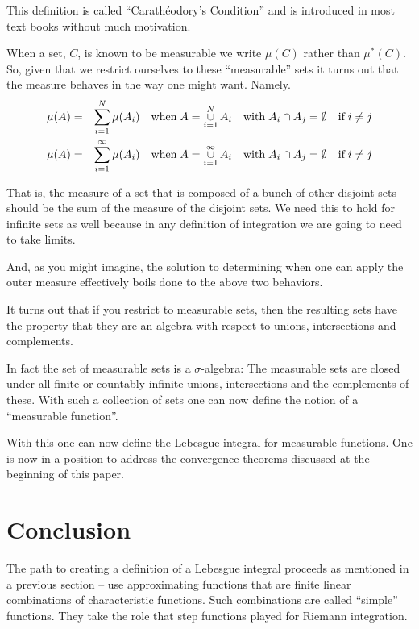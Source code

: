 \documentclass{article}
\begin{document}
This definition is called ``Carath\'eodory's Condition'' and is introduced in most
text books without much motivation.
 
When a set, $C$, is known to be measurable we write $\mu(C)$ rather than $\mu^*(C)$.
So, given that we restrict ourselves to these ``measurable'' sets it turns out that
the measure behaves in the way one might want. Namely.
\begin{eqnarray*}
	\mu(A) & = & \sum_{i=1}^N\limits \mu(A_i) \quad \text{when} \; A = \mathop{\cup}_{i=1}^N\limits A_i \quad \text{with} \;  A_i \cap A_j = \emptyset \quad \text{if} \; i \neq j \\
	\mu(A) & = & \sum_{i=1}^\infty\limits \mu(A_i) \quad \text{when} \; A = \mathop{\cup}_{i=1}^\infty\limits A_i \quad \text{with} \; A_i \cap A_j = \emptyset \quad \text{if} \; i \neq j
\end{eqnarray*}

That is, the measure of a set that is composed of a bunch of other disjoint 
sets should be the sum of the measure of the disjoint sets. We need this to hold
for infinite sets as well because in any definition of integration we are going 
to need to take limits.

And, as you might imagine, the solution to determining when one can apply the 
outer measure effectively boils done to the above two behaviors.

It turns out that if you restrict to measurable sets, 
then the resulting sets have the property that they are an 
algebra with respect to unions, intersections and complements. 

In fact the set of measurable sets is a $\sigma$-algebra:
The measurable sets are closed under all finite or countably infinite unions, intersections and the complements of these.
With such a collection of sets one can now define the notion of a ``measurable function''.

With this one can now define the Lebesgue integral for measurable functions.
One is now in a position to address the convergence theorems discussed at 
the beginning of this paper.


\section{Conclusion}

The path to creating a definition of a Lebesgue integral proceeds as mentioned 
in a previous section -- use approximating functions that are finite linear
combinations of characteristic functions. Such combinations are called ``simple''
functions. They take the role that step functions played for Riemann integration. 
\end{document}
